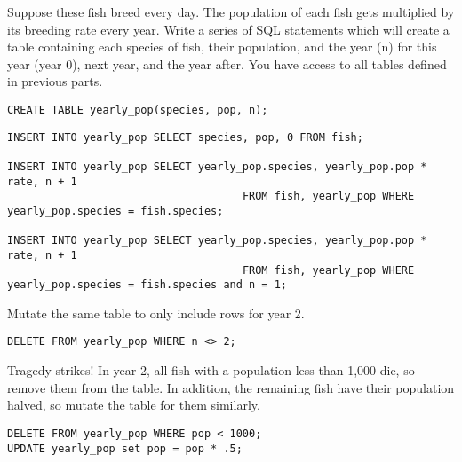 \begin{blocksection}
\question Suppose these fish breed every day. The population of each fish gets multiplied by its breeding rate every year. Write a series of SQL statements which will create a table containing each species of fish, their population, and the year (n) for this year (year 0), next year, and the year after.
You have access to all tables defined in previous parts.

\begin{lstlisting}
CREATE TABLE yearly_pop(species, pop, n);
\end{lstlisting}
\begin{solution}[1.5in]
\begin{lstlisting}
INSERT INTO yearly_pop SELECT species, pop, 0 FROM fish;

INSERT INTO yearly_pop SELECT yearly_pop.species, yearly_pop.pop * rate, n + 1 
                                     FROM fish, yearly_pop WHERE yearly_pop.species = fish.species;

INSERT INTO yearly_pop SELECT yearly_pop.species, yearly_pop.pop * rate, n + 1 
                                     FROM fish, yearly_pop WHERE yearly_pop.species = fish.species and n = 1;
\end{lstlisting}
\end{solution}

\question Mutate the same table to only include rows for year 2.
\begin{solution}[1in]
\begin{lstlisting}
DELETE FROM yearly_pop WHERE n <> 2;
\end{lstlisting}
\end{solution}

\question Tragedy strikes! In year 2, all fish with a population less than 1,000 die, so remove them from the table. In addition, the remaining fish have their population halved, so mutate the table for them similarly.
\begin{solution}[1in]
\begin{lstlisting}
DELETE FROM yearly_pop WHERE pop < 1000;
UPDATE yearly_pop set pop = pop * .5;
\end{lstlisting}
\end{solution}
\end{blocksection}
